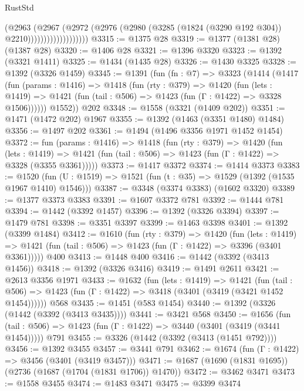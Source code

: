 \begin{lexlean}{RustStd}
\begin{coremodule}
                              (@2963
                                (@2967
                                  (@2972
                                    (@2976
                                      (@2980
                                        (@3285 (@1824 (@3290 @192 @304)) @2210)))))))))))))))))))
@3315 := @1375 @28
@3319 := @1377 (@1381 @28) (@1387 @28)
@3320 := @1406 @28
@3321 := @1396 @3320
@3323 := @1392 (@3321 @1411)
@3325 := @1434 (@1435 @28)
@3326 := @1430 @3325
@3328 := @1392 (@3326 @1459)
@3345 := @1391
    (fun (fn : @7) =>
    @3323
      (@1414
        (@1417
          (fun (params : @1416) =>
          @1418
            (fun (rty : @379) =>
            @1420
              (fun (lets : @1419) =>
              @1421 (fun (tail : @506) => @1423 (fun (Γ : @1422) => @3328 @1506))))))
        @1552))
    @202
@3348 := @1558 (@3321 (@1409 @202))
@3351 := @1471 (@1472 @202) @1967
@3355 := @1392 (@1463 (@3351 @1480) @1484)
@3356 := @1497 @202
@3361 := @1494 (@1496 @3356 @1971 @1452 @1454)
@3372 := fun (params : @1416) =>
  @1418
    (fun (rty : @379) =>
    @1420
      (fun (lets : @1419) =>
      @1421 (fun (tail : @506) => @1423 (fun (Γ : @1422) => @3328 (@3355 @3361)))))
@3373 := @1417 @3372
@3374 := @1414 @3373
@3383 := @1520 (fun (U : @1519) => @1521 (fun (t : @35) => @1529 (@1392 (@1535 @1967 @1410) @1546)))
@3387 := @3348 (@3374 @3383) (@1602 @3320)
@3389 := @1377 @3373 @3383
@3391 := @1607 @3372 @781
@3392 := @1444 @781
@3394 := @1442 (@3392 @1457)
@3396 := @1392 (@3326 @3394)
@3397 := @1479 @781
@3398 := @3351 @3397
@3399 := @1463 @3398
@3401 := @1392 (@3399 @1484)
@3412 := @1610
    (fun (rty : @379) =>
    @1420
      (fun (lets : @1419) =>
      @1421 (fun (tail : @506) => @1423 (fun (Γ : @1422) => @3396 (@3401 @3361)))))
    @400
@3413 := @1448 @400
@3416 := @1442 (@3392 (@3413 @1456))
@3418 := @1392 (@3326 @3416)
@3419 := @1491 @2611
@3421 := @2613 @3356 @1971
@3433 := @1632
    (fun (lets : @1419) =>
    @1421
      (fun (tail : @506) => @1423 (fun (Γ : @1422) => @3418 (@3401 (@3419 (@3421 @1452 @1454))))))
    @568
@3435 := @1451 (@583 @1454)
@3440 := @1392 (@3326 (@1442 (@3392 (@3413 @3435))))
@3441 := @3421 @568
@3450 := @1656
    (fun (tail : @506) => @1423 (fun (Γ : @1422) => @3440 (@3401 (@3419 (@3441 @1454)))))
    @791
@3455 := @3326 (@1442 (@3392 (@3413 (@1451 @792))))
@3456 := @1392 @3455
@3457 := @3441 @791
@3462 := @1674 (fun (Γ : @1422) => @3456 (@3401 (@3419 @3457)))
@3471 := @1687 (@1690 (@1831 @1695)) (@2736 (@1687 (@1704 (@1831 @1706)) @1470))
@3472 := @3462 @3471
@3473 := @1558 @3455
@3474 := @1483 @3471
@3475 := @3399 @3474

\end{coremodule}
\end{lexlean}
